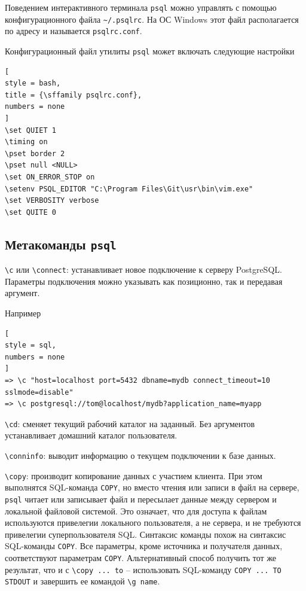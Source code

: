 \documentclass[%
	11pt,
	a4paper,
	utf8,
		]{article}
\begin{document}
Поведением интерактивного терминала \texttt{psql} можно управлять с помощью конфигурационного файла \verb|~/.psqlrc|. На ОС Windows этот файл располагается по адресу  и называется \verb|psqlrc.conf|.

Конфигурационный файл утилиты \texttt{psql} может включать следующие настройки
\begin{lstlisting}[
style = bash,
title = {\sffamily psqlrc.conf},
numbers = none
]
\set QUIET 1
\timing on
\pset border 2
\pset null <NULL>
\set ON_ERROR_STOP on
\setenv PSQL_EDITOR "C:\Program Files\Git\usr\bin\vim.exe"
\set VERBOSITY verbose
\set QUITE 0
\end{lstlisting}

\subsection{Метакоманды \texttt{psql}}

\noindent \verb|\c| или \verb|\connect|: устанавливает новое подключение к серверу PostgreSQL. Параметры подключения можно указывать как позиционно, так и передавая аргумент.

Например
\begin{lstlisting}[
style = sql,
numbers = none
]
=> \c "host=localhost port=5432 dbname=mydb connect_timeout=10 sslmode=disable"
=> \c postgresql://tom@localhost/mydb?application_name=myapp
\end{lstlisting}

\noindent \verb|\cd|: сменяет текущий рабочий каталог на заданный. Без аргументов устанавливает домашний каталог пользователя.

\noindent \verb|\conninfo|: выводит информацию о текущем подключении к базе данных.

\noindent \verb|\copy|: производит копирование данных с участием клиента. При этом выполнятся SQL-команда \texttt{COPY}, но вместо чтения или записи в файл на сервере, \texttt{psql} читает или записывает файл и пересылает данные между сервером и локальной файловой системой. Это означает, что для доступа к файлам используются привелегии локального пользователя, а не сервера, и не требуются привелегии суперпользователя SQL. Синтаксис команды похож на синтаксис SQL-команды \texttt{COPY}. Все параметры, кроме источника и получателя данных, соответствуют параметрам \texttt{COPY}. Альтернативный способ получить тот же результат, что и с \verb|\copy ... to| -- использовать SQL-команду \texttt{COPY ... TO STDOUT} и завершить ее командой \verb|\g name|.
\end{document}
